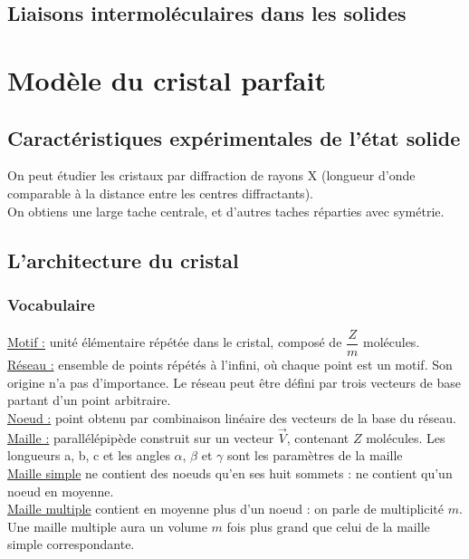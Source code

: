 \documentclass[13pt, twoside, a4paper, french, tikz]{report}
\begin{document}
  
  \section{Liaisons intermoléculaires dans les solides}\label{sec:liaisons-intermoleculaires-dans-les-solides}


\chapter{Modèle du cristal parfait}\label{ch:modele-du-cristal-parfait}
  
  
  \section{Caractéristiques expérimentales de l'état solide}\label{sec:caracteristiques-experimentales-de-l'etat-solide}
    
    On peut étudier les cristaux par diffraction de rayons X (longueur d'onde comparable à la distance entre les centres diffractants).\\
    On obtiens une large tache centrale, et d'autres taches réparties avec symétrie.\\
  
  
  \section{L'architecture du cristal}\label{sec:l'architecture-du-cristal}
    
    \subsection{Vocabulaire}\label{subsec:vocabulaire}
      
      \underline{Motif :} unité élémentaire répétée dans le cristal, composé de $\dfrac{Z}{m}$ molécules.\\
      \underline{Réseau :} ensemble de points répétés à l'infini, où chaque point est un motif.
      Son origine n'a pas d'importance.
      Le réseau peut être défini par trois vecteurs de base partant d'un point arbitraire.\\
      \underline{Noeud :} point obtenu par combinaison linéaire des vecteurs de la base du réseau.\\
      \underline{Maille :} parallélépipède construit sur un vecteur $\vec V$, contenant $Z$ molécules.
      Les longueurs a, b, c et les angles $\alpha$, $\beta$ et $\gamma$ sont les paramètres de la maille\\
      \underline{Maille simple} ne contient des noeuds qu'en ses huit sommets : ne contient qu'un noeud en moyenne.\\
      \underline{Maille multiple} contient en moyenne plus d'un noeud : on parle de multiplicité $m$.\\
      Une maille multiple aura un volume $m$ fois plus grand que celui de la maille simple correspondante.\\
      
\end{document}
